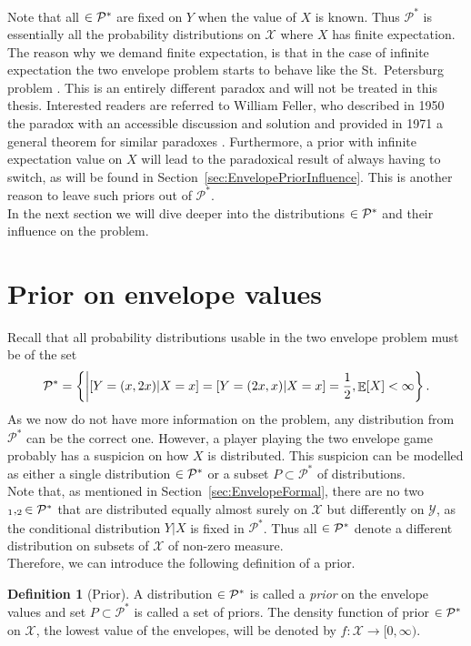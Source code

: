 \documentclass[a4paper]{report}
\theoremstyle{plain}
\theoremstyle{definition}
\newtheorem{definition}[theorem]{Definition}
\theoremstyle{remark}
\numberwithin{equation}{chapter}
\let\P\relax
\DeclareMathOperator{\P}{\mathbb{P}}
\DeclareMathOperator{\E}{\mathbb{E}}
\DeclareMathOperator{\1}{\mathbbm{1}}
\newcommand{\X}{\mathcal{X}}
\newcommand{\Y}{\mathcal{Y}}
\newcommand{\Pmod}{\mathcal{P}^*}
\begin{document}
Note that all $\P\in\Pmod$ are fixed on $Y$ when the value of $X$ is known. Thus $\Pmod$ is essentially all the probability distributions on $\X$ where $X$ has finite expectation.\\
The reason why we demand finite expectation, is that in the case of infinite expectation the two envelope problem starts to behave like the St.~Petersburg problem \cite{Brams95,Broome95,Tzur18}. This is an entirely different paradox and will not be treated in this thesis. Interested readers are referred to William Feller, who described in 1950 the paradox with an accessible discussion and solution \cite{Feller50} and provided in 1971 a general theorem for similar paradoxes \cite{Feller71}. Furthermore, a prior with infinite expectation value on $X$ will lead to the paradoxical result of always having to switch, as will be found in Section~\ref{sec:EnvelopePriorInfluence}. This is another reason to leave such priors out of $\Pmod$.\\
In the next section we will dive deeper into the distributions $\P\in\Pmod$ and their influence on the problem.

\section{Prior on envelope values}\label{sec:EnvelopePrior}
Recall that all probability distributions usable in the two envelope problem must be of the set
\begin{equation}
\Pmod=\left\{\P\middle|\P[Y=(x,2x)|X=x]=\P[Y=(2x,x)|X=x]=\frac{1}{2},\E_{\P}[X]<\infty\right\}.
\end{equation}
As we now do not have more information on the problem, any distribution from $\Pmod$ can be the correct one. However, a player playing the two envelope game probably has a suspicion on how $X$ is distributed. This suspicion can be modelled as either a single distribution $\P\in\Pmod$ or a subset $P\subset\Pmod$ of distributions.\\
Note that, as mentioned in Section~\ref{sec:EnvelopeFormal}, there are no two $\P_1,\P_2\in\Pmod$ that are distributed equally almost surely on $\X$ but differently on $\Y$, as the conditional distribution $Y|X$ is fixed in $\Pmod$. Thus all $\P\in\Pmod$ denote a different distribution on subsets of $\X$ of non-zero measure.\\
Therefore, we can introduce the following definition of a prior.

\begin{definition}[Prior]
A distribution $\P\in\Pmod$ is called a \emph{prior} on the envelope values and set $P\subset\Pmod$ is called a set of priors. The density function of prior $\P\in\Pmod$ on $\X$, the lowest value of the envelopes, will be denoted by $f\colon\X\to[0,\infty)$.
\end{definition}
\end{document}
